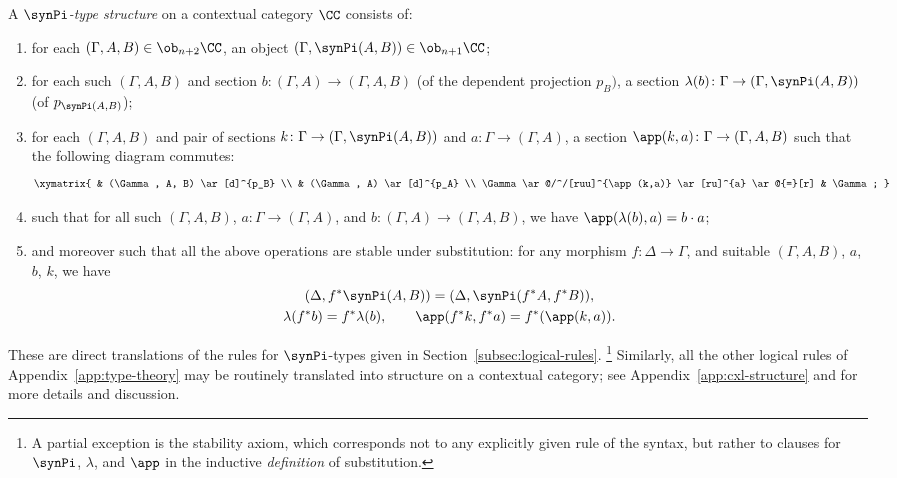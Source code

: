 \begin{definition} \label{def:pi-type-structure}
 A \emph{$\synPi$-type structure} on a contextual category $\CC$ consists of:
 \begin{enumerate}
  \item for each $(\Gamma, A, B) \in \ob_{n+2} \CC$, an object $(\Gamma, \synPi(A, B)) \in \ob_{n+1} \CC$;
  \item for each such $(\Gamma, A, B)$ and section $b \colon (\Gamma, A) \to (\Gamma, A, B)$ (of the dependent projection $p_B)$, a section $\lambda(b) \colon \Gamma \to (\Gamma, \synPi(A, B))$ (of $p_{\synPi(A,B)}$);
  \item for each $(\Gamma, A, B)$ and pair of sections $k \colon \Gamma \to (\Gamma, \synPi (A, B))$ and $a \colon \Gamma \to (\Gamma, A)$, a section $\app(k,a) \colon \Gamma \to (\Gamma, A, B)$ such that the following diagram commutes:
      \[\xymatrix{ & (\Gamma, A, B) \ar[d]^{p_B} \\
       & (\Gamma, A) \ar[d]^{p_A} \\
       \Gamma \ar@/^/[ruu]^{\app(k,a)} \ar[ru]^{a} \ar@{=}[r] & \Gamma ;
      }\]
 \item such that for all such $(\Gamma, A, B)$, $a \colon \Gamma \to (\Gamma, A)$, and $b \colon (\Gamma, A) \to (\Gamma, A, B)$, we have $\app(\lambda(b),a) = b \cdot a$;
 \item and moreover such that all the above operations are stable under substitution: for any morphism $f \colon \Delta \to \Gamma$, and suitable $(\Gamma,A,B)$, $a$, $b$, $k$, we have
   \begin{gather*}
     (\Delta, f^*\synPi(A, B)) = (\Delta, \synPi(f^*A, f^*B)), \\
     \lambda({f^*b}) = f^*\lambda(b), \qquad \app(f^*k,f^*a) = f^*(\app(k,a)).
   \end{gather*}
 \end{enumerate}
\end{definition}

These are direct translations of the rules for $\synPi$-types given in Section~\ref{subsec:logical-rules}.%
%
\footnote{A partial exception is the stability axiom, which corresponds not to any explicitly given rule of the syntax, but rather to clauses for $\synPi$, $\lambda$, and $\app$ in the inductive \emph{definition} of substitution.}
%
Similarly, all the other logical rules of Appendix~\ref{app:type-theory} may be routinely translated into structure on a contextual category; see Appendix~\ref{app:cxl-structure} and \cite[3.3]{hofmann:syntax-and-semantics} for more details and discussion.

